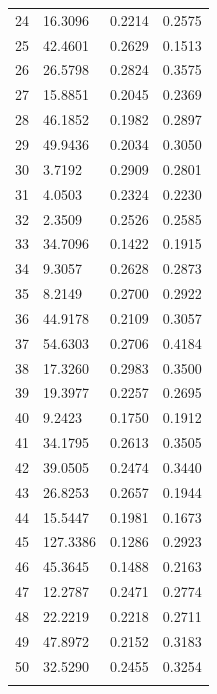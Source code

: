 \documentclass[preprint,12pt,authoryear]{elsarticle}
\begin{document}
\begin{longtable}{ p{}  p{} p{} p{} }
24 & 16.3096  & 0.2214 & 0.2575                    \\
25 & 42.4601  & 0.2629 & 0.1513                    \\
26 & 26.5798  & 0.2824  & 0.3575                    \\
27 & 15.8851 & 0.2045 & 0.2369                    \\
28 & 46.1852 & 0.1982 & 0.2897  \\
29 & 49.9436 & 0.2034 & 0.3050                    \\
30 & 3.7192 & 0.2909 & 0.2801                    \\
31 & 4.0503 & 0.2324  & 0.2230                    \\
32 & 2.3509 & 0.2526 & 0.2585                    \\
33 & 34.7096  & 0.1422 & 0.1915                    \\
34 & 9.3057  & 0.2628  & 0.2873                    \\
35 & 8.2149  & 0.2700 & 0.2922                    \\
36 & 44.9178 & 0.2109 & 0.3057                    \\
37 & 54.6303 & 0.2706 & 0.4184                    \\
38 & 17.3260 & 0.2983 & 0.3500                    \\
39 & 19.3977 & 0.2257 & 0.2695                    \\
40 & 9.2423 & 0.1750 & 0.1912                    \\
41 & 34.1795 & 0.2613 & 0.3505                    \\
42 & 39.0505 & 0.2474 & 0.3440                    \\
43 & 26.8253 & 0.2657 & 0.1944                    \\
44 & 15.5447 & 0.1981 & 0.1673                    \\
45 & 127.3386  & 0.1286 & 0.2923                    \\
46 & 45.3645 & 0.1488 & 0.2163                    \\
47 & 12.2787 & 0.2471 & 0.2774                    \\
48  & 22.2219 & 0.2218 & 0.2711                    \\
49 & 47.8972 & 0.2152 & 0.3183                    \\
50 & 32.5290 & 0.2455 & 0.3254                    \\ \hline
\noalign{\smallskip}
\end{longtable}
\end{document}
